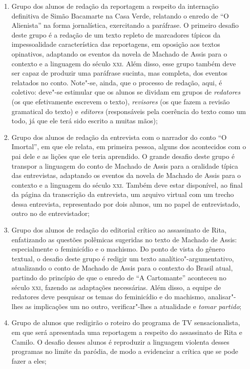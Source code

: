 \documentclass{extarticle}
\begin{document}
\begin{enumerate}
\item Grupo dos alunos de redação da reportagem a respeito da internação
definitiva de Simão Bacamarte na Casa Verde, relatando o enredo de ``O
Alienista'' na forma jornalística, exercitando a paráfrase. O primeiro
desafio deste grupo é a redação de um texto repleto de marcadores
típicos da impessoalidade característica das reportagens, em oposição
aos textos opinativos, adaptando os eventos da novela de Machado de
Assis para o contexto e a linguagem do século \textsc{xxi}. Além disso, esse
grupo também deve ser capaz de produzir uma paráfrase sucinta, mas
completa, dos eventos relatados no conto. Note"-se, ainda, que o processo
de redação, aqui, é coletivo: deve"-se estimular que os alunos se dividam
em grupos de \emph{redatores} (os que efetivamente escrevem o texto),
\emph{revisores} (os que fazem a revisão gramatical do texto) e
\emph{editores} (responsáveis pela coerência do texto como um todo, já
que ele terá sido escrito a muitas mãos);

\item Grupo dos alunos de redação da entrevista com o narrador do conto ``O
Imortal'', em que ele relata, em primeira pessoa, alguns dos acontecidos
com o pai dele e as lições que ele teria aprendido. O grande desafio
deste grupo é transpor a linguagem do conto de Machado de Assis para a
oralidade típica das entrevistas, adaptando os eventos da novela de
Machado de Assis para o contexto e a linguagem do século \textsc{xxi}. Também
deve estar disponível, ao final da página da transcrição da entrevista,
um arquivo virtual com um trecho dessa entrevista, representado por dois
alunos, um no papel de entrevistado, outro no de entrevistador;

\item Grupo dos alunos de redação do editorial crítico ao assassinato de
Rita, enfatizando as questões polêmicas sugeridas no texto de Machado de
Assis: especialmente o feminicídio e o machismo. Do ponto de vista do
gênero textual, o desafio deste grupo é redigir um texto
analítico"-argumentativo, atualizando o conto de Machado de Assis para o
contexto do Brasil atual, partindo do princípio de que o enredo de ``A
Cartomante'' aconteceu no século \textsc{xxi}, fazendo as adaptações necessárias.
Além disso, a equipe de redatores deve pesquisar os temas do feminicídio
e do machismo, analisar"-lhes as implicações um no outro, verificar"-lhes
a atualidade e \emph{tomar partido};

\item Grupo de alunos que redigirão o roteiro do programa de TV
sensacionalista, em que será apresentada uma reportagem a respeito do
assassinato de Rita e Camilo. O desafio desses alunos é reproduzir a
linguagem violenta desses programas no limite da paródia, de modo a
evidenciar a crítica que se pode fazer a eles;


\end{enumerate}
\end{document}

